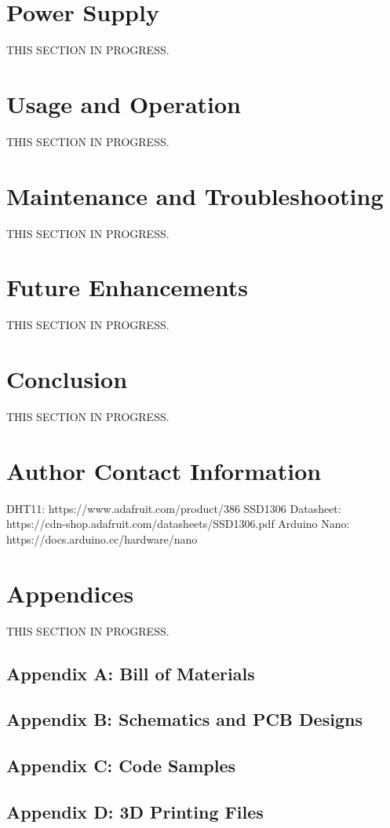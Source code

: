 \documentclass{article}
\begin{document}
\begin{multicols}{2}
		\section{Power Supply}
		THIS SECTION IN PROGRESS.
		
		\section{Usage and Operation}
		THIS SECTION IN PROGRESS.
		
		\section{Maintenance and Troubleshooting}
		THIS SECTION IN PROGRESS.
		
		\section{Future Enhancements}
		THIS SECTION IN PROGRESS.
		
		\section{Conclusion}
		THIS SECTION IN PROGRESS.
	
		\section{Author Contact Information}
		
\end{multicols} %

\begin{thebibliography}{X}
	 DHT11: https://www.adafruit.com/product/386
	 SSD1306 Datasheet: https://cdn-shop.adafruit.com/datasheets/SSD1306.pdf
	 Arduino Nano: https://docs.arduino.cc/hardware/nano
\end{thebibliography}	
	
		\section{Appendices}
		THIS SECTION IN PROGRESS.
		
		\subsection{Appendix A: Bill of Materials}
		
		\subsection{Appendix B: Schematics and PCB Designs}
		
		\subsection{Appendix C: Code Samples}
		
		\subsection{Appendix D: 3D Printing Files}
	
\end{document}
